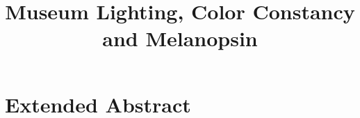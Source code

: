 \documentclass{article}
\title{Museum Lighting, Color Constancy and Melanopsin}
\date{}
\begin{document}
\maketitle

\section{Extended Abstract}
\end{document}
